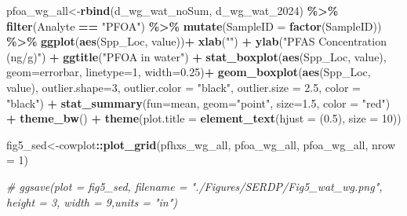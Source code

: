 \documentclass[
]{article}
\newenvironment{Shaded}{\begin{snugshade}}{\end{snugshade}}
\newcommand{\AttributeTok}[1]{\textcolor[rgb]{0.13,0.29,0.53}{#1}}
\newcommand{\CommentTok}[1]{\textcolor[rgb]{0.56,0.35,0.01}{\textit{#1}}}
\newcommand{\DecValTok}[1]{\textcolor[rgb]{0.00,0.00,0.81}{#1}}
\newcommand{\FloatTok}[1]{\textcolor[rgb]{0.00,0.00,0.81}{#1}}
\newcommand{\FunctionTok}[1]{\textcolor[rgb]{0.13,0.29,0.53}{\textbf{#1}}}
\newcommand{\NormalTok}[1]{#1}
\newcommand{\OtherTok}[1]{\textcolor[rgb]{0.56,0.35,0.01}{#1}}
\newcommand{\SpecialCharTok}[1]{\textcolor[rgb]{0.81,0.36,0.00}{\textbf{#1}}}
\newcommand{\StringTok}[1]{\textcolor[rgb]{0.31,0.60,0.02}{#1}}
\begin{document}
\begin{Shaded}
\begin{Highlighting}[]
\NormalTok{pfoa\_wg\_all}\OtherTok{\textless{}{-}}\FunctionTok{rbind}\NormalTok{(d\_wg\_wat\_noSum, d\_wg\_wat\_2024) }\SpecialCharTok{\%\textgreater{}\%} 
  \FunctionTok{filter}\NormalTok{(Analyte }\SpecialCharTok{==} \StringTok{"PFOA"}\NormalTok{) }\SpecialCharTok{\%\textgreater{}\%} 
  \FunctionTok{mutate}\NormalTok{(}\AttributeTok{SampleID =} \FunctionTok{factor}\NormalTok{(SampleID)) }\SpecialCharTok{\%\textgreater{}\%} 
  \FunctionTok{ggplot}\NormalTok{(}\FunctionTok{aes}\NormalTok{(Spp\_Loc, value))}\SpecialCharTok{+}
    \FunctionTok{xlab}\NormalTok{(}\StringTok{""}\NormalTok{) }\SpecialCharTok{+}
    \FunctionTok{ylab}\NormalTok{(}\StringTok{"PFAS Concentration (ng/g)"}\NormalTok{) }\SpecialCharTok{+}
    \FunctionTok{ggtitle}\NormalTok{(}\StringTok{"PFOA in water"}\NormalTok{) }\SpecialCharTok{+}
    \FunctionTok{stat\_boxplot}\NormalTok{(}\FunctionTok{aes}\NormalTok{(Spp\_Loc, value),}
                 \AttributeTok{geom=}\StringTok{\textquotesingle{}errorbar\textquotesingle{}}\NormalTok{, }\AttributeTok{linetype=}\DecValTok{1}\NormalTok{, }\AttributeTok{width=}\FloatTok{0.25}\NormalTok{)}\SpecialCharTok{+}
    \FunctionTok{geom\_boxplot}\NormalTok{(}\FunctionTok{aes}\NormalTok{(Spp\_Loc, value),}
                 \AttributeTok{outlier.shape=}\DecValTok{3}\NormalTok{,}
                 \AttributeTok{outlier.color =} \StringTok{"black"}\NormalTok{,}
                 \AttributeTok{outlier.size =} \FloatTok{2.5}\NormalTok{,}
                 \AttributeTok{color =} \StringTok{"black"}\NormalTok{) }\SpecialCharTok{+} 
    \FunctionTok{stat\_summary}\NormalTok{(}\AttributeTok{fun=}\NormalTok{mean, }\AttributeTok{geom=}\StringTok{"point"}\NormalTok{, }\AttributeTok{size=}\FloatTok{1.5}\NormalTok{, }\AttributeTok{color =} \StringTok{"red"}\NormalTok{) }\SpecialCharTok{+}
    \FunctionTok{theme\_bw}\NormalTok{() }\SpecialCharTok{+}
    \FunctionTok{theme}\NormalTok{(}\AttributeTok{plot.title =} \FunctionTok{element\_text}\NormalTok{(}\AttributeTok{hjust =}\NormalTok{ (}\FloatTok{0.5}\NormalTok{), }\AttributeTok{size =} \DecValTok{10}\NormalTok{))}

\NormalTok{fig5\_sed}\OtherTok{\textless{}{-}}\NormalTok{cowplot}\SpecialCharTok{::}\FunctionTok{plot\_grid}\NormalTok{(pfhxs\_wg\_all, pfoa\_wg\_all, pfoa\_wg\_all, }
                   \AttributeTok{nrow =} \DecValTok{1}\NormalTok{)}

\CommentTok{\# ggsave(plot = fig5\_sed, filename = "./Figures/SERDP/Fig5\_wat\_wg.png", height = 3, width = 9,units = "in")}
\end{Highlighting}
\end{Shaded}
\end{document}
